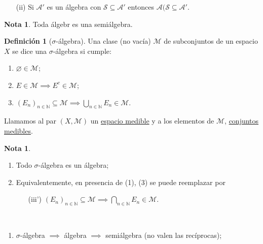 \documentclass[11pt]{article}
\theoremstyle{definition} %
\newtheorem{definition}[theorem]{Definición}
\newtheorem{note}[theorem]{Nota}
\newcommand{\N}{\mathbb{N}}
\begin{document}
\begin{property}
\begin{eg}
\begin{enumerate}
\begin{enumerate}
				\item[(ii)] Si $\mathscr{A}'$ es un álgebra con $\mathscr{S} \subseteq \mathscr{A}'$ entonces $\mathscr{A}(\mathscr{S} \subseteq \mathscr{A}'$.
			\end{enumerate}
		\end{enumerate}
	\end{eg}

	\begin{note}
		Toda álgebr es una semiálgebra.
	\end{note}

	\begin{definition}[$\sigma$-álgebra]
		Una clase (no vacía) $\mathscr{M}$ de subconjuntos de un espacio $X$ se dice una $\sigma$-álgebra si cumple:
		\begin{enumerate}
			\item $\varnothing \in \mathscr{M}$;

			\item $E \in \mathscr{M} \implies E^c \in \mathscr{M}$;

			\item $(E_n)_{n\in\N} \subseteq \mathscr{M} \implies \displaystyle\bigcup_{n\in\N} E_n \in \mathscr{M}$.
		\end{enumerate}
		\noindent Llamamos al par $(X,\mathscr{M})$ un \underline{espacio medible} y a los elementos de $\mathscr{M}$, \underline{conjuntos medibles}.
	\end{definition}

	\begin{note}~
		\begin{enumerate}
			\item Todo $\sigma$-álgebra es un álgebra;

			\item Equivalentemente, en presencia de (1), (3) se puede reemplazar por
			\begin{enumerate}
				\item[(iii')] $(E_n)_{n\in\N} \subseteq \mathscr{M} \implies \displaystyle\bigcap_{n\in\N} E_n \in \mathscr{M}$.
			\end{enumerate}
		\end{enumerate}
	\end{note}

	\begin{eg}~
		\begin{enumerate}
			\item $\sigma$-álgebra $\implies$ álgebra $\implies$ semiálgebra (no valen las recíprocas);


\end{enumerate}
\end{eg}
\end{property}
\end{document}
